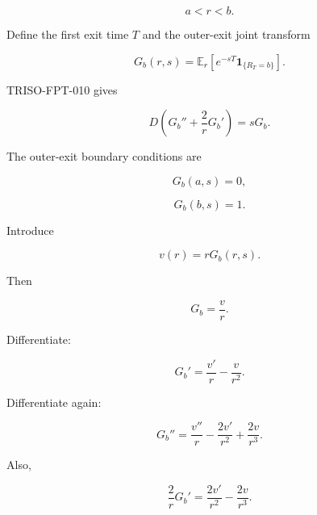 \documentclass[11pt,a4paper]{article}
\begin{document}
\begin{equation}
a<r<b.
\tag{TRISO-FPT-020}
\label{eq:triso-fpt-020}
\end{equation}

Define the first exit time $T$ and the outer-exit joint transform

\begin{equation}
G_b(r,s)
=
\mathbb E_r\left[e^{-sT}\mathbf 1_{\{R_T=b\}}\right].
\tag{TRISO-FPT-021}
\label{eq:triso-fpt-021}
\end{equation}

TRISO-FPT-010 gives

\begin{equation}
D\left(G_b''+\frac{2}{r}G_b'\right)=sG_b.
\tag{TRISO-FPT-022}
\label{eq:triso-fpt-022}
\end{equation}

The outer-exit boundary conditions are

\begin{equation}
G_b(a,s)=0,
\tag{TRISO-FPT-023}
\label{eq:triso-fpt-023}
\end{equation}

\begin{equation}
G_b(b,s)=1.
\tag{TRISO-FPT-024}
\label{eq:triso-fpt-024}
\end{equation}

Introduce

\begin{equation}
v(r)=rG_b(r,s).
\tag{TRISO-FPT-025}
\label{eq:triso-fpt-025}
\end{equation}

Then

\begin{equation}
G_b=\frac{v}{r}.
\tag{TRISO-FPT-026}
\label{eq:triso-fpt-026}
\end{equation}

Differentiate:

\begin{equation}
G_b'
=
\frac{v'}{r}
-
\frac{v}{r^2}.
\tag{TRISO-FPT-027}
\label{eq:triso-fpt-027}
\end{equation}

Differentiate again:

\begin{equation}
G_b''
=
\frac{v''}{r}
-
\frac{2v'}{r^2}
+
\frac{2v}{r^3}.
\tag{TRISO-FPT-028}
\label{eq:triso-fpt-028}
\end{equation}

Also,

\begin{equation}
\frac{2}{r}G_b'
=
\frac{2v'}{r^2}
-
\frac{2v}{r^3}.
\tag{TRISO-FPT-029}
\label{eq:triso-fpt-029}
\end{equation}
\end{document}
